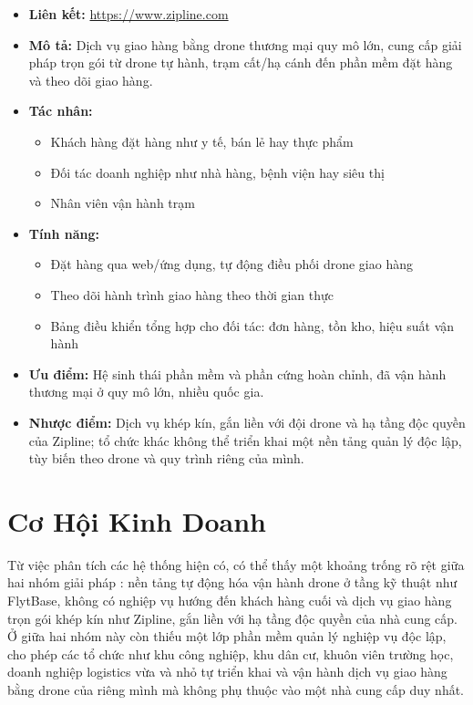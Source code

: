 \begin{itemize}
  \item \textbf{Liên kết:} \url{https://www.zipline.com}
  \item \textbf{Mô tả:} Dịch vụ giao hàng bằng drone thương mại quy mô lớn, cung cấp giải pháp trọn gói từ drone tự hành, trạm cất/hạ cánh đến phần mềm đặt hàng và theo dõi giao hàng.
  \item \textbf{Tác nhân:}
    \begin{itemize}
      \item Khách hàng đặt hàng như y tế, bán lẻ hay thực phẩm
      \item Đối tác doanh nghiệp như nhà hàng, bệnh viện hay siêu thị
      \item Nhân viên vận hành trạm
    \end{itemize}
  \item \textbf{Tính năng:}
    \begin{itemize}
      \item Đặt hàng qua web/ứng dụng, tự động điều phối drone giao hàng
      \item Theo dõi hành trình giao hàng theo thời gian thực
      \item Bảng điều khiển tổng hợp cho đối tác: đơn hàng, tồn kho, hiệu suất vận hành
    \end{itemize}
  \item \textbf{Ưu điểm:} Hệ sinh thái phần mềm và phần cứng hoàn chỉnh, đã vận hành thương mại ở quy mô lớn, nhiều quốc gia.
  \item \textbf{Nhược điểm:} Dịch vụ khép kín, gắn liền với đội drone và hạ tầng độc quyền của Zipline; tổ chức khác không thể triển khai một nền tảng quản lý độc lập, tùy biến theo drone và quy trình riêng của mình.
\end{itemize}

\section{Cơ Hội Kinh Doanh}

Từ việc phân tích các hệ thống hiện có, có thể thấy một khoảng trống rõ rệt giữa hai nhóm giải pháp : nền tảng tự động hóa vận hành drone ở tầng kỹ thuật như FlytBase, không có nghiệp vụ hướng đến khách hàng cuối và dịch vụ giao hàng trọn gói khép kín như Zipline, gắn liền với hạ tầng độc quyền của nhà cung cấp. Ở giữa hai nhóm này còn thiếu một lớp phần mềm quản lý nghiệp vụ độc lập, cho phép các tổ chức như khu công nghiệp, khu dân cư, khuôn viên trường học, doanh nghiệp logistics vừa và nhỏ tự triển khai và vận hành dịch vụ giao hàng bằng drone của riêng mình mà không phụ thuộc vào một nhà cung cấp duy nhất.


